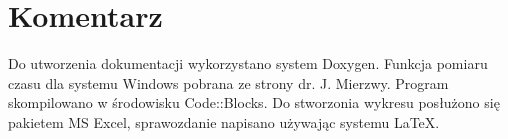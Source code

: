 \documentclass[twoside]{article}
\newcommand{\+}{\discretionary{\mbox{\scriptsize$\hookleftarrow$}}{}{}}
\begin{document}
\section{Komentarz}
Do utworzenia dokumentacji wykorzystano system Doxygen.
Funkcja pomiaru czasu dla systemu Windows pobrana ze strony dr. J. Mierzwy. Program skompilowano w środowisku Code::Blocks. Do stworzonia wykresu posłużono się pakietem MS Excel, sprawozdanie napisano używając systemu \LaTeX.
\end{document}
